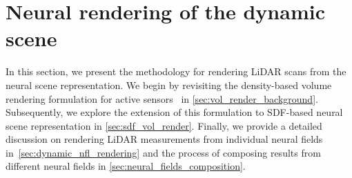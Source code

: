 \section{Neural rendering of the dynamic scene}
In this section, we present the methodology for rendering LiDAR scans from the neural scene representation. We begin by revisiting the density-based volume rendering formulation for active sensors~\cite{Huang2023nfl} in \cref{sec:vol_render_background}. Subsequently, we explore the extension of this formulation to SDF-based neural scene representation in \cref{sec:sdf_vol_render}. Finally, we provide a detailed discussion on rendering LiDAR measurements from individual neural fields in~\cref{sec:dynamic_nfl_rendering} and the process of composing results from different neural fields in \cref{sec:neural_fields_composition}.



